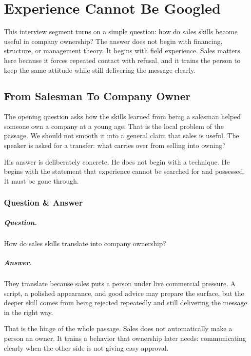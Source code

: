 \chapter{Experience Cannot Be Googled}

This interview segment turns on a simple question: how do sales skills become useful in company ownership? The answer does not begin with financing, structure, or management theory. It begins with field experience. Sales matters here because it forces repeated contact with refusal, and it trains the person to keep the same attitude while still delivering the message clearly.

\section{From Salesman To Company Owner}

The opening question asks how the skills learned from being a salesman helped someone own a company at a young age. That is the local problem of the passage. We should not smooth it into a general claim that sales is useful. The speaker is asked for a transfer: what carries over from selling into owning?

His answer is deliberately concrete. He does not begin with a technique. He begins with the statement that experience cannot be searched for and possessed. It must be gone through.

\subsection{Question \& Answer}

\paragraph{Question.}
How do sales skills translate into company ownership?

\paragraph{Answer.}
They translate because sales puts a person under live commercial pressure. A script, a polished appearance, and good advice may prepare the surface, but the deeper skill comes from being rejected repeatedly and still delivering the message in the right way.

That is the hinge of the whole passage. Sales does not automatically make a person an owner. It trains a behavior that ownership later needs: communicating clearly when the other side is not giving easy approval.

